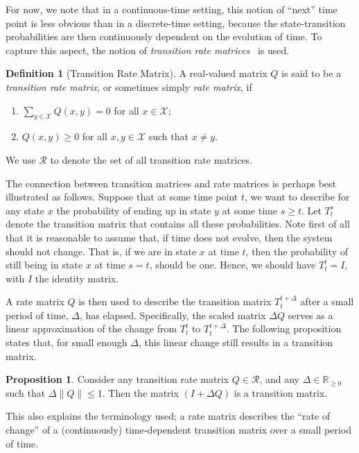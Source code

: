 \documentclass[10pt,a4paper]{paper}
\theoremstyle{definition}
\newtheorem{proposition}[theorem]{Proposition}
\newtheorem{definition}{Definition}
\newcommand{\reals}{\mathbb{R}}
\newcommand{\realsnonneg}{\reals_{\geq 0}}
\newcommand{\states}{\mathcal{X}}
\newcommand{\norm}[1]{\left\lVert #1 \right\rVert}
\begin{document}
For now, we note that in a continuous-time setting, this notion of ``next'' time point is less obvious than in a discrete-time setting, because the state-transition probabilities are then continuously dependent on the evolution of time. To capture this aspect, the notion of \emph{transition rate matrices}~\cite{norris1998markov} is used.
\begin{definition}[Transition Rate Matrix]\label{def:rate_matrix}
A real-valued matrix $Q$ is said to be a \emph{transition rate matrix}, or sometimes simply \emph{rate matrix}, if

\vspace{5pt}
\begin{enumerate}[label=R\arabic*:,ref=R\arabic*]
\item\label{def:Q:sumzero}
$\sum_{y\in\states}Q(x,y)=0$ for all $x\in\states$;
\item\label{def:Q:nonnegoffdiagonal}
$Q(x,y)\geq0$ for all $x,y\in\states$ such that $x\neq y$.
\end{enumerate}
\noindent
We use $\mathcal{R}$ to denote the set of all transition rate matrices. 
\vspace{5pt}
\end{definition}

The connection between transition matrices and rate matrices is perhaps best illustrated as follows. Suppose that at some time point $t$, we want to describe for any state $x$ the probability of ending up in state $y$ at some time $s\geq t$. Let $T_t^s$ denote the transition matrix that contains all these probabilities. Note first of all that it is reasonable to assume that, if time does not evolve, then the system should not change. That is, if we are in state $x$ at time $t$, then the probability of still being in state $x$ at time $s=t$, should be one. Hence, we should have $T_t^t=I$, with $I$ the identity matrix. 

A rate matrix $Q$ is then used to describe the transition matrix $T_t^{t+\Delta}$ after a small period of time, $\Delta$, has elapsed. Specifically, the scaled matrix $\Delta Q$ serves as a linear approximation of the change from $T_t^t$ to $T_t^{t+\Delta}$. The following proposition states that, for small enough $\Delta$, this linear change still results in a transition matrix.

\begin{proposition}\label{prop:stochastic_from_rate_matrix}
Consider any transition rate matrix $Q\in\mathcal{R}$, and any $\Delta\in\realsnonneg$ such that $\Delta \norm{Q}\leq 1$. Then the matrix $(I+\Delta Q)$ is a transition matrix.
\end{proposition}
This also explains the terminology used; a rate matrix describes the ``rate of change'' of a (continuously) time-dependent transition matrix over a small period of time.
\end{document}
